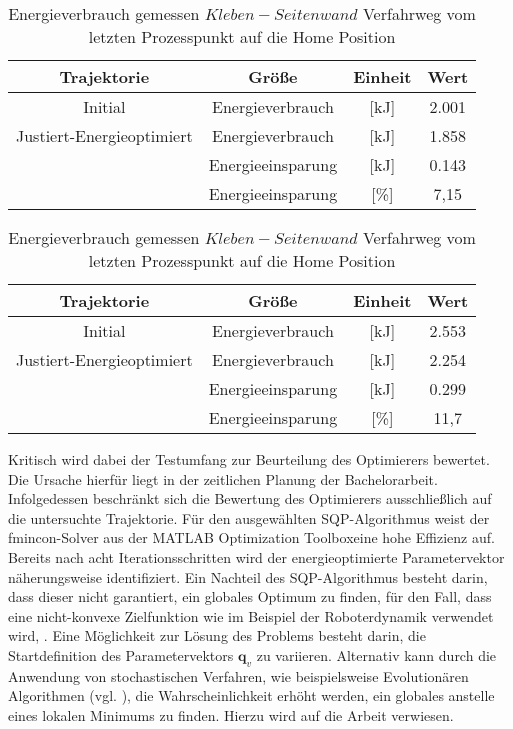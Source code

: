 \begin{table}[tbph]
	\centering
	\caption{Energieverbrauch simuliert $Kleben-Seitenwand$ Verfahrweg vom letzten Prozesspunkt auf die  Home Position}
	\label{tab:energieverbrauch-simuliert}
	\begin{tabular}{|c|c|c|c|}
		\hline
		Trajektorie & Größe & Einheit & Wert \\
		\hline
		Initial & Energieverbrauch & [kJ] &2.001  \\
		\hline
		Justiert-Energieoptimiert & Energieverbrauch & [kJ] &1.858  \\
		\hline
		& Energieeinsparung & [kJ] &0.143  \\
		\hline
		& Energieeinsparung & [\%] &7,15  \\
		\hline
	\end{tabular}
	\centering
	\caption{Energieverbrauch gemessen $Kleben-Seitenwand$ Verfahrweg vom letzten Prozesspunkt auf die  Home Position}
	\label{tab:energieverbrauch-gemessen}
	\begin{tabular}{|c|c|c|c|}
		\hline
		Trajektorie & Größe & Einheit & Wert \\
		\hline
		Initial & Energieverbrauch & [kJ] &2.553  \\
		\hline
		Justiert-Energieoptimiert & Energieverbrauch & [kJ] &2.254 \\
		\hline
		& Energieeinsparung & [kJ] &0.299  \\
		\hline
		& Energieeinsparung & [\%] &11,7 \\
		\hline
	\end{tabular}
\end{table}
%
Kritisch wird dabei der Testumfang zur Beurteilung des Optimierers bewertet. Die Ursache hierfür liegt in der zeitlichen Planung der Bachelorarbeit. Infolgedessen beschränkt sich die Bewertung des Optimierers ausschließlich auf die untersuchte Trajektorie. Für den ausgewählten SQP-Algorithmus weist der fmincon-Solver aus der MATLAB\textsuperscript{\textregistered} Optimization Toolbox\texttrademark eine hohe Effizienz auf. Bereits nach acht Iterationsschritten wird der energieoptimierte Parametervektor näherungsweise identifiziert. Ein Nachteil des SQP-Algorithmus besteht darin, dass dieser nicht garantiert, ein globales Optimum zu finden, für den Fall, dass eine nicht-konvexe Zielfunktion wie im Beispiel der Roboterdynamik verwendet wird,  \cite[S.~535]{Nocedal.2006}. Eine Möglichkeit zur Lösung des Problems besteht darin, die Startdefinition des Parametervektors $\bm{q}_v$ zu variieren.  Alternativ kann durch die Anwendung von stochastischen Verfahren, wie beispielsweise Evolutionären Algorithmen (vgl. \cite[S.~]{Papageorgiou.2015}), die Wahrscheinlichkeit erhöht werden, ein globales anstelle eines lokalen Minimums zu finden.  Hierzu wird auf die Arbeit \cite{Nonoyama.2022} verwiesen. 

